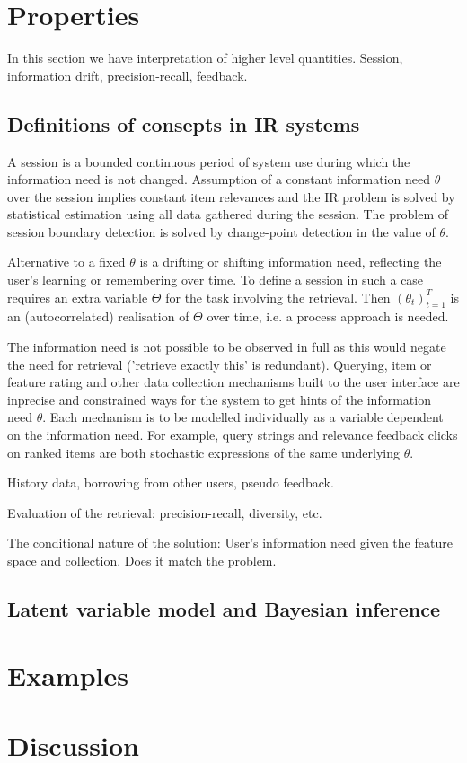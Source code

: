 \documentclass[10pt]{tufte-handout}
\begin{document}
\section{Properties}

In this section we have interpretation of higher level quantities. Session, information drift, precision-recall, feedback.

\subsection{Definitions of consepts in IR systems}
A session is a bounded continuous period of system use during which the information need is not changed. Assumption of a constant information need $\theta$ over the session implies constant item relevances and the IR problem is solved by statistical estimation using all data gathered during the session. The problem of session boundary detection is solved by change-point detection in the value of $\theta$. 

Alternative to a fixed $\theta$ is a drifting or shifting information need, reflecting the user's learning or remembering over time. To define a session in such a case requires an extra variable $\Theta$ for the task involving the retrieval. Then $(\theta_t)_{t=1}^T$ is an (autocorrelated) realisation of $\Theta$ over time, i.e. a process approach is needed.

The information need is not possible to be observed in full as this would negate the need for retrieval ('retrieve exactly this' is redundant). Querying, item or feature rating and other data collection mechanisms built to the user interface are inprecise and constrained ways for the system to get hints of the information need $\theta$. Each mechanism is to be modelled individually as a variable dependent on the information need. For example, query strings and relevance feedback clicks on ranked items are both stochastic expressions of the same underlying $\theta$.



History data, borrowing from other users, pseudo feedback.

Evaluation of the retrieval: precision-recall, diversity, etc.

The conditional nature of the solution: User's information need given the feature space and collection. Does it match the problem.

\subsection{Latent variable model and Bayesian inference}

\section{Examples}

\section{Discussion}
\end{document}
